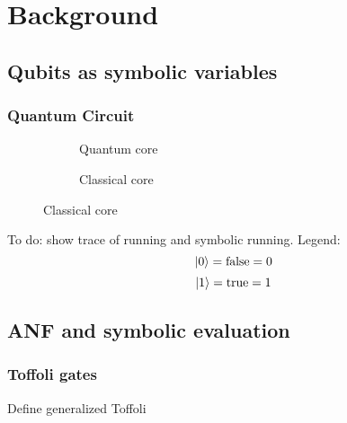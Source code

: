 \documentclass{beamer}
\begin{document}
\section[Background]{Background}

\subsection[Symbolic]{Qubits as symbolic variables}
\begin{frame}
\frametitle{Quantum Circuit}

\begin{figure}[b]
  \centering
\begin{subfigure}[b]{.45\textwidth}
    \centering
\caption{\label{fig:bellqcore}Quantum core}
\end{subfigure}
\qquad
\begin{subfigure}[b]{.45\textwidth}
    \centering
\caption{\label{fig:bellccore}Classical core}
\end{subfigure}
\end{figure}

To do: show trace of running and symbolic running.
Legend:
  $$ \ket{0} = \text{false} = 0 $$
  $$ \ket{1} = \text{true} = 1 $$
\end{frame}


\subsection[ANF]{ANF and symbolic evaluation}

\begin{frame}
\frametitle{Toffoli gates}
Define generalized Toffoli
\end{frame}
\end{document}
